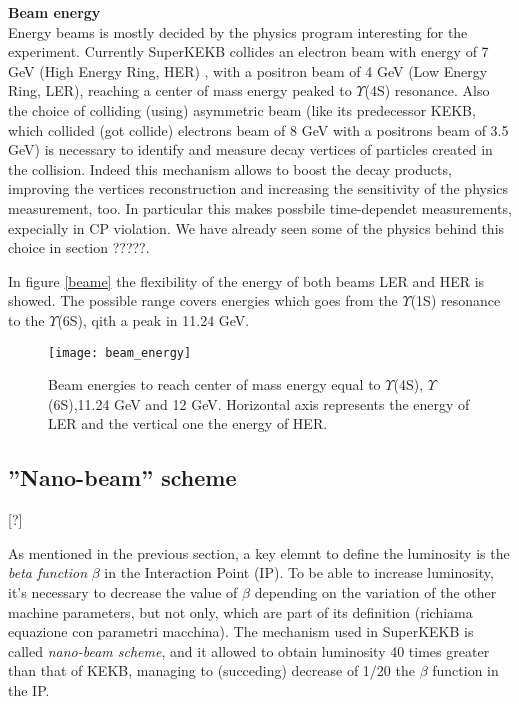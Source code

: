 \textbf{Beam energy}\\


Energy beams is mostly decided by the physics program interesting for the experiment. Currently SuperKEKB collides an electron beam with energy of 7 GeV (High Energy Ring, HER) , with a positron beam of 4 GeV (Low Energy Ring, LER), reaching a center of mass energy peaked to $\Upsilon$(4S) resonance.
Also the choice of colliding (using) asymmetric beam (like its predecessor KEKB, which collided (got collide) electrons beam of 8 GeV with a positrons beam of 3.5 GeV) is necessary to identify and measure decay vertices of particles created in the collision. Indeed this mechanism allows to boost the decay products, improving the vertices reconstruction and increasing the sensitivity of the physics measurement, too. In particular this makes possbile time-dependet measurements, expecially in CP violation. We have already seen some of the physics behind this choice in section ?????.


In figure \vref{beame} the flexibility of the energy of both beams LER and HER is showed. The possible range covers energies which goes from the $\Upsilon$(1S) resonance to the $\Upsilon$(6S), qith a peak in 11.24 GeV.

\begin{figure}
\centering
\texttt{[image: beam\_energy]}
\caption{Beam energies to reach center of mass energy equal to $\Upsilon$(4S), $\Upsilon$(6S),11.24 GeV and 12 GeV. Horizontal axis represents the energy of LER and the vertical one the energy of HER. }
\label{fig:beame}
\end{figure}


\subsection{''Nano-beam'' scheme} [?]

As mentioned in the previous section, a key elemnt to define the luminosity is the \textit{beta function} $\beta$ in the Interaction Point (IP). To be able to increase luminosity, it's necessary to decrease the value of $\beta$ depending on the variation of the other machine parameters, but not only, which are part of its definition (richiama equazione con parametri macchina).
The mechanism used in SuperKEKB is called \textit{nano-beam scheme}, and it allowed to obtain luminosity 40 times greater than that of KEKB, managing to (succeding) decrease of 1/20 the $\beta$ function in the IP.

